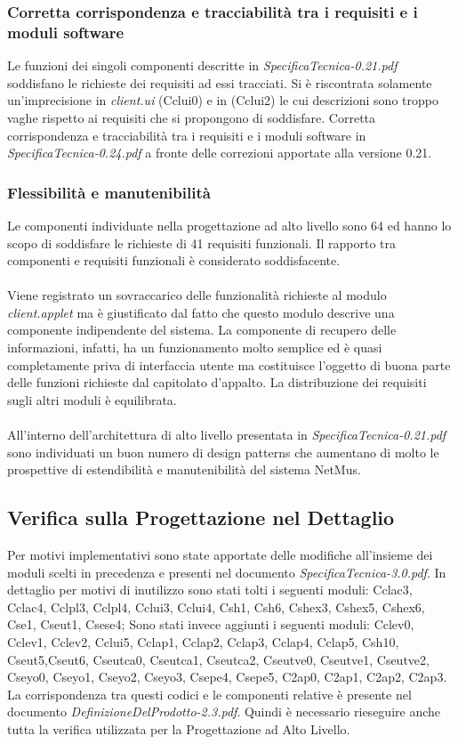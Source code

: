\subsubsection*{Corretta corrispondenza e tracciabilit\`a tra i requisiti e  i
moduli software} 
Le funzioni dei singoli componenti descritte in
\emph{SpecificaTecnica-0.21.pdf} soddisfano le richieste dei requisiti ad essi
tracciati. Si \`e riscontrata solamente un'imprecisione in \emph{client.ui}
(Cclui0) e in  (Cclui2) le cui descrizioni sono troppo vaghe
rispetto ai requisiti che si propongono di soddisfare. 
Corretta corrispondenza e tracciabilit\`a tra i requisiti e  i
moduli software in \emph{SpecificaTecnica-0.24.pdf} a fronte delle correzioni
apportate alla versione 0.21. 

\subsubsection*{Flessibilit\`a e manutenibilit\`a} 
Le componenti individuate nella
progettazione ad alto livello sono 64 ed hanno lo scopo di soddisfare le
richieste di 41 requisiti funzionali. Il rapporto tra componenti e requisiti
funzionali \`e considerato soddisfacente. \\\\ 
Viene registrato un sovraccarico delle funzionalit\`a richieste al modulo
\emph{client.applet} ma \`e giustificato dal fatto che questo modulo descrive
una componente indipendente del sistema. La componente di recupero delle
informazioni, infatti, ha un funzionamento molto semplice ed \`e quasi
completamente priva di interfaccia utente ma costituisce l'oggetto di buona
parte delle funzioni richieste dal capitolato d'appalto. La distribuzione dei
requisiti sugli altri moduli \`e equilibrata.\\\\
All'interno dell'architettura di alto livello presentata in
\emph{SpecificaTecnica-0.21.pdf} sono individuati un buon numero di design
patterns che aumentano di molto le prospettive di estendibilit\`a e
manutenibilit\`a del sistema NetMus.

\subsection{Verifica sulla Progettazione nel Dettaglio}
Per motivi implementativi sono state apportate delle modifiche all'insieme dei
moduli scelti in precedenza e presenti nel documento
\emph{SpecificaTecnica-3.0.pdf}. In dettaglio per motivi di inutilizzo sono
stati tolti i seguenti moduli: Cclac3, Cclac4, Cclpl3, Cclpl4, Cclui3, Cclui4,
Csh1, Csh6, Cshex3, Cshex5, Cshex6, Cse1, Cseut1, Csese4; Sono stati invece
aggiunti i seguenti moduli: Cclev0, Cclev1, Cclev2, Cclui5, Cclap1, Cclap2,
Cclap3, Cclap4, Cclap5, Csh10, Cseut5,Cseut6, Cseutca0, Cseutca1, Cseutca2,
Cseutve0, Cseutve1, Cseutve2, Cseyo0, Cseyo1, Cseyo2, Cseyo3, Csepe4, Csepe5,
C2ap0, C2ap1, C2ap2, C2ap3. La corrispondenza tra questi codici e le componenti
relative \`e presente nel documento \emph{DefinizioneDelProdotto-2.3.pdf}.
Quindi \`e necessario rieseguire anche tutta la verifica utilizzata per la
Progettazione ad Alto Livello.

